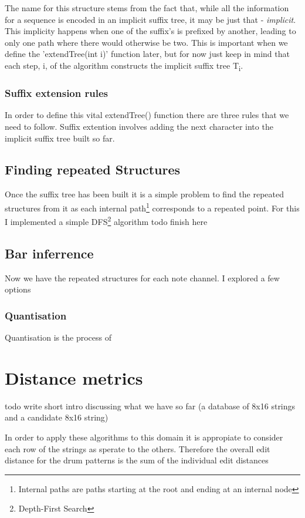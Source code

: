 \documentclass[12pt,twoside,notitlepage]{report}
\begin{document}
				The name for this structure stems from the fact that, while all the information for a sequence is encoded in an implicit suffix tree, it may be just that - \emph{implicit}. This implicity happens when one of the suffix's is prefixed by another, leading to only one path where there would otherwise be two. This is important when we define the 'extendTree(int i)' function later, but for now just keep in mind that each step, i, of the algorithm constructs the implicit suffix tree T\textsubscript{i}.
				
				\subsubsection{Suffix extension rules}
				In order to define this vital extendTree() function there are three rules that we need to follow. Suffix extention involves adding the next character into the implicit suffix tree built so far. 
			\subsection{Finding repeated Structures}
			Once the suffix tree has been built it is a simple problem to find the repeated structures from it as each internal path\footnote{Internal paths are paths starting at the root and ending at an internal node} corresponds to a repeated point. For this I implemented a simple DFS\footnote{Depth-First Search} algorithm
			todo finish here

			
		\subsection{Bar inferrence}
		Now we have the repeated structures for each note channel. I explored a few options 
			\subsubsection{Quantisation}
			Quantisation is the process of 
	\section{Distance metrics}
	todo write short intro discussing what we have so far (a database of 8x16 strings and a candidate 8x16 string)
	
	In order to apply these algorithms to this domain it is appropiate to consider each row of the strings as sperate to the others. Therefore the overall edit distance for the drum patterns is the sum of the individual edit distances
	
\end{document}
